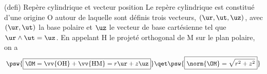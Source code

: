 \documentclass[../../main/main.tex]{subfiles}
\begin{document}
\begin{tcb*}[sidebyside, righthand ratio=.25](defi)
  {Repère cylindrique et vecteur position}
		Le repère cylindrique est constitué d'une origine O autour de laquelle sont
		définis trois vecteurs, $(\ur,\ut,\uz)$, avec $(\ur,\ut)$ la base polaire et
		$\uz$ le vecteur de base cartésienne tel que $\ur \wedge \ut = \uz$.
    \bigbreak
    En appelant H le projeté orthogonal de M sur le plan polaire, on a
		\[
			\psw{\boxed{\OM = \vv{\rm OH} + \vv{\rm HM} = r\ur + z\uz}}
			\qet
			\psw{\boxed{\norm{\OM} = \sqrt{r^2 + z^2}}}
		\]
	\tcblower
		\begin{center}
\end{center}
\end{tcb*}
\end{document}
